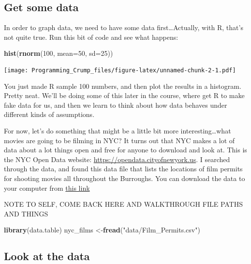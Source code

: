 \documentclass[]{book}
\newenvironment{Shaded}{\begin{snugshade}}{\end{snugshade}}
\newcommand{\KeywordTok}[1]{\textcolor[rgb]{0.13,0.29,0.53}{\textbf{{#1}}}}
\newcommand{\DataTypeTok}[1]{\textcolor[rgb]{0.13,0.29,0.53}{{#1}}}
\newcommand{\DecValTok}[1]{\textcolor[rgb]{0.00,0.00,0.81}{{#1}}}
\newcommand{\StringTok}[1]{\textcolor[rgb]{0.31,0.60,0.02}{{#1}}}
\newcommand{\NormalTok}[1]{{#1}}
\theoremstyle{definition}
\theoremstyle{definition}
\theoremstyle{definition}
\theoremstyle{remark}
\begin{document}
\subsection{Get some data}\label{get-some-data}

In order to graph data, we need to have some data first\ldots{}Actually,
with R, that's not quite true. Run this bit of code and see what
happens:

\begin{Shaded}
\begin{Highlighting}[]
\KeywordTok{hist}\NormalTok{(}\KeywordTok{rnorm}\NormalTok{(}\DecValTok{100}\NormalTok{, }\DataTypeTok{mean=}\DecValTok{50}\NormalTok{, }\DataTypeTok{sd=}\DecValTok{25}\NormalTok{))}
\end{Highlighting}
\end{Shaded}

\texttt{[image: Programming\_Crump\_files/figure-latex/unnamed-chunk-2-1.pdf]}

You just made R sample 100 numbers, and then plot the results in a
histogram. Pretty neat. We'll be doing some of this later in the course,
where get R to make fake data for us, and then we learn to think about
how data behaves under different kinds of assumptions.

For now, let's do something that might be a little bit more
interesting\ldots{}what movies are going to be filming in NYC? It turns
out that NYC makes a lot of data about a lot things open and free for
anyone to download and look at. This is the NYC Open Data website:
\url{https://opendata.cityofnewyork.us}. I searched through the data,
and found this data file that lists the locations of film permits for
shooting movies all throughout the Burroughs. You can download the data
to your computer from
\href{https://raw.githubusercontent.com/CrumpLab/statisticsLab/master/data/Film_Permits.csv}{this
link}

NOTE TO SELF, COME BACK HERE AND WALKTHROUGH FILE PATHS AND THINGS

\begin{Shaded}
\begin{Highlighting}[]
\KeywordTok{library}\NormalTok{(data.table)}
\NormalTok{nyc_films <-}\KeywordTok{fread}\NormalTok{(}\StringTok{"data/Film_Permits.csv"}\NormalTok{)}
\end{Highlighting}
\end{Shaded}

\subsection{Look at the data}\label{look-at-the-data}
\end{document}
